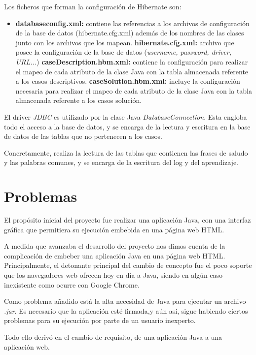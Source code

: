 Los ficheros que forman la configuración de Hibernate son:

\begin{itemize}
\tightlist
\item
\textbf{databaseconfig.xml:} contiene las referencias a los archivos de configuración de la base de datos (hibernate.cfg.xml) además de los nombres de las clases junto con los archivos que los mapean.
\textbf{hibernate.cfg.xml:} archivo que posee la configuración de la base de datos (\emph{username, password, driver, URL...})
\textbf{caseDescription.hbm.xml:} contiene la configuración para realizar el mapeo de cada atributo de la clase Java con la tabla almacenada referente a los casos descriptivos.
\textbf{caseSolution.hbm.xml:} incluye la configuración necesaria para realizar el mapeo de cada atributo de la clase Java con la tabla almacenada referente a los casos solución.
\end{itemize}

El driver \emph{JDBC} es utilizado por la clase Java \emph{DatabaseConnection}. Esta engloba todo el acceso a la base de datos, y se encarga de la lectura y escritura en la base de datos de las tablas que no pertenecen a los casos.

Concretamente, realiza la lectura de las tablas que contienen las frases de saludo y las palabras comunes, y se encarga de la escritura del log y del aprendizaje.


\section{Problemas}\label{problemas}

El propósito inicial del proyecto fue realizar una aplicación Java, con una interfaz gráfica que permitiera su ejecución embebida en una página web HTML.

A medida que avanzaba el desarrollo del proyecto nos dimos cuenta de la complicación de embeber una aplicación Java en una página web HTML. Principalmente, el detonante principal del cambio de concepto fue el poco soporte que los navegadores web ofrecen hoy en día a Java, siendo en algún caso inexistente como ocurre con Google Chrome.

Como problema añadido está la alta necesidad de Java para ejecutar un archivo \emph{.jar}. Es necesario que la aplicación esté firmada,y aún así, sigue habiendo ciertos problemas para su ejecución por parte de un usuario inexperto.

Todo ello derivó en el cambio de requisito, de una aplicación Java a una aplicación web.

